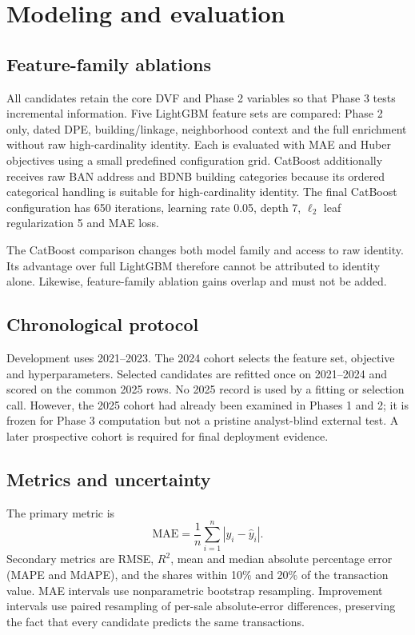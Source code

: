 \documentclass[11pt,a4paper]{article}
\begin{document}
\section{Modeling and evaluation}

\subsection{Feature-family ablations}

All candidates retain the core DVF and Phase 2 variables so that Phase 3 tests
incremental information. Five LightGBM feature sets are compared: Phase 2 only,
dated DPE, building/linkage, neighborhood context and the full enrichment
without raw high-cardinality identity. Each is evaluated with MAE and Huber
objectives using a small predefined configuration grid. CatBoost additionally
receives raw BAN address and BDNB building categories because its ordered
categorical handling is suitable for high-cardinality identity. The final
CatBoost configuration has 650 iterations, learning rate 0.05, depth 7,
$\ell_2$ leaf regularization 5 and MAE loss.

The CatBoost comparison changes both model family and access to raw identity.
Its advantage over full LightGBM therefore cannot be attributed to identity
alone. Likewise, feature-family ablation gains overlap and must not be added.

\subsection{Chronological protocol}

Development uses 2021--2023. The 2024 cohort selects the feature set, objective
and hyperparameters. Selected candidates are refitted once on 2021--2024 and
scored on the common 2025 rows. No 2025 record is used by a fitting or selection
call. However, the 2025 cohort had already been examined in Phases 1 and 2; it is
frozen for Phase 3 computation but not a pristine analyst-blind external test.
A later prospective cohort is required for final deployment evidence.

\subsection{Metrics and uncertainty}

The primary metric is
\begin{equation}
  \mathrm{MAE}=\frac{1}{n}\sum_{i=1}^{n}|y_i-\hat y_i|.
\end{equation}
Secondary metrics are RMSE, $R^2$, mean and median absolute percentage error
(MAPE and MdAPE), and the shares within 10\% and 20\% of the transaction value.
MAE intervals use nonparametric bootstrap resampling. Improvement intervals use
paired resampling of per-sale absolute-error differences, preserving the fact
that every candidate predicts the same transactions.
\end{document}

